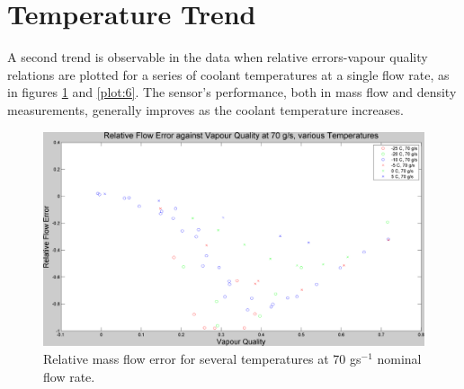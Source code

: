 \documentclass{report}
\begin{document}
\section{Temperature Trend}
A second trend is observable in the data when relative errors-vapour quality relations are plotted for a series of coolant temperatures  at a single flow rate, as in figures \ref{plot:5} and \ref{plot:6}. The sensor's performance, both in mass flow and density measurements, generally improves as the coolant temperature increases.
\FloatBarrier
\begin{figure}
\includegraphics[width=\textwidth]{plots/fig5}
\caption{Relative mass flow error for several temperatures at 70 gs$^{-1}$ nominal flow rate.}
\label{plot:5}
\end{figure}
\end{document}
